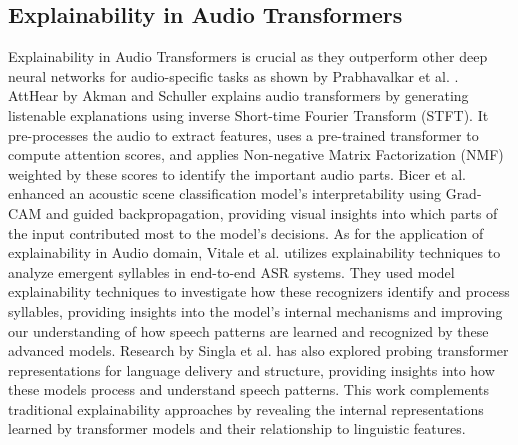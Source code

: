 \documentclass[../report.tex]{subfiles}
\begin{document}
    \subsection{Explainability in Audio Transformers}
    Explainability in Audio Transformers is crucial as they outperform other deep neural networks for audio-specific tasks as shown by Prabhavalkar et al. \cite{10301513}.
    AttHear by Akman and Schuller \cite{10447390} explains audio transformers by generating listenable explanations using inverse Short-time Fourier Transform (STFT). It pre-processes the audio to extract features, uses a pre-trained transformer to compute attention scores, and applies Non-negative Matrix Factorization (NMF) weighted by these scores to identify the important audio parts. Bicer et al. \cite{9914699} enhanced an acoustic scene classification model's interpretability using Grad-CAM and guided backpropagation, providing visual insights into which parts of the input contributed most to the model's decisions.
    As for the application of explainability in Audio domain, Vitale et al. \cite{vitale2024exploring} utilizes explainability techniques to analyze emergent syllables in end-to-end ASR systems. They used model explainability techniques to investigate how these recognizers identify and process syllables, providing insights into the model's internal mechanisms and improving our understanding of how speech patterns are learned and recognized by these advanced models. Research by Singla et al. \cite{10031189} has also explored probing transformer representations for language delivery and structure, providing insights into how these models process and understand speech patterns. This work complements traditional explainability approaches by revealing the internal representations learned by transformer models and their relationship to linguistic features.
\end{document}
